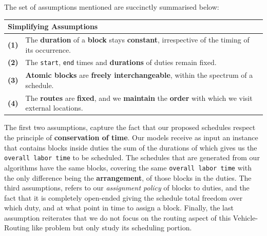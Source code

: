 \vspace{\baselineskip}
\noindent
The set of assumptions mentioned are succinctly summarised below:



	\begin{table}[ht]
	\renewcommand{\arraystretch}{1.7} %
		\centering
		\begin{tabular}{|c |p{}|} 
			\multicolumn{2}{l}{\textbf{Simplifying Assumptions}} \\
		    \hline
			\textbf{(1)}  & The \textbf{duration} of a \textbf{block} stays \textbf{constant}, irrespective of the timing of its occurrence.\\
            \hline
            \textbf{(2)}  & The \texttt{start}, \texttt{end} times and \textbf{durations} of duties remain fixed. \\
            \hline
            \textbf{(3)}  &\textbf{Atomic blocks} are \textbf{freely interchangeable}, within the spectrum of a schedule.\\
			\hline
			\textbf{(4)}  & The \textbf{routes} are \textbf{fixed}, and we \textbf{maintain} the \textbf{order} with which we visit external locations.\\
			\hline
		\end{tabular} 
	\end{table}
	
\vspace{\baselineskip}
\noindent
The first two assumptions, capture the fact that our proposed schedules respect the principle of \textbf{conservation of time}. Our models receive as input an instance that contains blocks inside duties the sum of the durations of which gives us the \texttt{overall labor time} to be scheduled. The schedules that are generated from our algorithms have the same blocks, covering the same \texttt{overall labor time} with the only difference being the \textbf{arrangement}, of those blocks in the duties. The third assumptions, refers to our \textit{assignment policy} of blocks to duties, and the fact that it is completely open-ended giving the schedule total freedom over which duty, and at what point in time to assign a block. Finally, the last assumption reiterates that we do not focus on the routing aspect of this Vehicle-Routing like problem but only study its scheduling portion.
	

